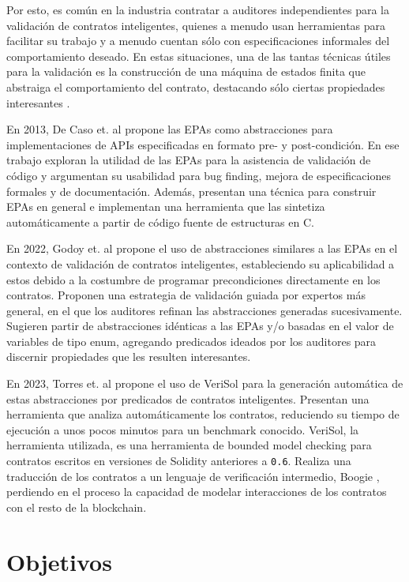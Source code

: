Por esto, es común en la industria contratar a auditores independientes para la validación de contratos inteligentes,
quienes a menudo usan herramientas para facilitar su trabajo y a menudo cuentan sólo con especificaciones informales del comportamiento deseado.
En estas situaciones, una de las tantas técnicas útiles para la validación es  la construcción de una máquina de estados finita que abstraiga el comportamiento del contrato, destacando sólo ciertas propiedades interesantes \cite{predicate-abstraction-for-smart-contract-validation}.

En 2013, De Caso et. al \cite{de-caso-epa} propone las EPAs como abstracciones para implementaciones de APIs especificadas en formato pre- y post-condición.
En ese trabajo exploran la utilidad de las EPAs para la asistencia de validación de código y argumentan su usabilidad para bug finding, mejora de especificaciones formales y de documentación.
Además, presentan una técnica para construir EPAs en general e implementan una herramienta que las sintetiza automáticamente a partir de código fuente de estructuras en C.

En 2022, Godoy et. al \cite{predicate-abstraction-for-smart-contract-validation} propone el uso de abstracciones similares a las EPAs en el contexto de validación de contratos inteligentes, estableciendo su aplicabilidad a estos debido a la costumbre de programar precondiciones directamente en los contratos.
Proponen una estrategia de validación guiada por expertos más general, en el que los auditores refinan las abstracciones generadas sucesivamente.
Sugieren partir de abstracciones idénticas a las EPAs y/o basadas en el valor de variables de tipo enum, agregando predicados ideados por los auditores para discernir propiedades que les resulten interesantes.

En 2023, Torres et. al \cite{torres} propone el uso de VeriSol \cite{verisol} para la generación automática de estas abstracciones por predicados de contratos inteligentes.
Presentan una herramienta que analiza automáticamente los contratos, reduciendo su tiempo de ejecución a unos pocos minutos para un benchmark conocido.
VeriSol, la herramienta utilizada, es una herramienta de bounded model checking para contratos escritos en versiones de Solidity anteriores a \texttt{0.6}.
Realiza una traducción de los contratos a un lenguaje de verificación intermedio, Boogie \cite{boogie}, perdiendo en el proceso la capacidad de modelar interacciones de los contratos con el resto de la blockchain.

\section{Objetivos}

